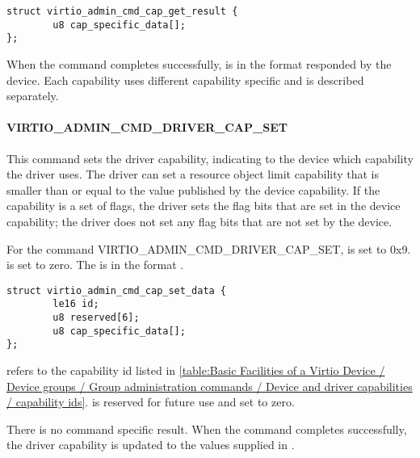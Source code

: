 \begin{lstlisting}
struct virtio_admin_cmd_cap_get_result {
        u8 cap_specific_data[];
};
\end{lstlisting}

When the command completes successfully, 
is in the format  responded
by the device. Each capability uses different capability specific
 and is described separately.

\paragraph{VIRTIO_ADMIN_CMD_DRIVER_CAP_SET}\label{par:Basic Facilities of a Virtio Device / Device groups / Group administration commands / Device and driver capabilities / VIRTIO_ADMIN_CMD_DRIVER_CAP_SET}

This command sets the driver capability, indicating to the device which capability
the driver uses. The driver can set a resource object limit capability that is smaller
than or equal to the value published by the device capability.
If the capability is a set of flags, the driver sets the flag bits that are set
in the device capability; the driver does not set any flag bits that are not
set by the device.

For the command VIRTIO_ADMIN_CMD_DRIVER_CAP_SET,  is set to 0x9.
 is set to zero.
The  is in the format
.

\begin{lstlisting}
struct virtio_admin_cmd_cap_set_data {
        le16 id;
        u8 reserved[6];
        u8 cap_specific_data[];
};
\end{lstlisting}

 refers to the capability id listed in \ref{table:Basic Facilities of a Virtio Device / Device groups / Group administration commands / Device and driver capabilities / capability ids}.
 is reserved for future use and set to zero.

There is no command specific result.
When the command completes successfully, the driver capability is updated to
the values supplied in .



